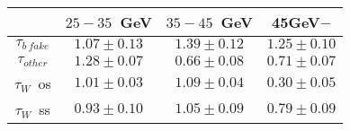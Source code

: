 \centering
\begin{tabular}{|c|c|c|c|} \hline
 & $25-35$~GeV & $35-45$~GeV & 45GeV$-$\\\hline
$\tau_{b~fake}$ & $1.07\pm0.13$ & $1.39\pm0.12$ & $1.25\pm0.10$\\\hline
$\tau_{other}$ & $1.28\pm0.07$ & $0.66\pm0.08$ & $0.71\pm0.07$\\\hline
$\tau_{W}$~os & $1.01\pm0.03$ & $1.09\pm0.04$ & $0.30\pm0.05$\\\hline
$\tau_{W}$~ss & $0.93\pm0.10$ & $1.05\pm0.09$ & $0.79\pm0.09$\\\hline
\end{tabular}
